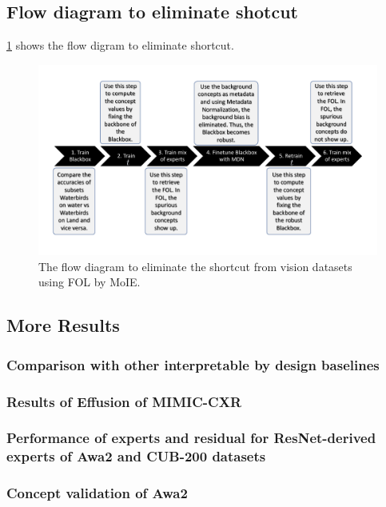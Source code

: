 \documentclass{article}
\theoremstyle{plain}
\theoremstyle{definition}
\theoremstyle{remark}
\begin{document}
\subsection{Flow diagram to eliminate shotcut}
\label{app:shortcut}
\cref{fig:spurious_flow} shows the flow digram to eliminate shortcut.
\begin{figure}[h]
\centering
\includegraphics[width=1.0\textwidth]
{figures/Supp/Spurious_Flow.pdf}
\caption{The flow diagram to eliminate the shortcut from vision datasets using FOL by MoIE.}
\label{fig:spurious_flow}
\end{figure}


\subsection{More Results}
\subsubsection{Comparison with other interpretable by design baselines}
\label{app:more_baselines}


\subsubsection{Results of Effusion of MIMIC-CXR}
\label{app:mimic_cxr}


\subsubsection{Performance of experts and residual for ResNet-derived experts of Awa2 and CUB-200 datasets}
\label{app:resnet_cv}


\subsubsection{Concept validation of Awa2}
\label{app:awa2}

\end{document}
